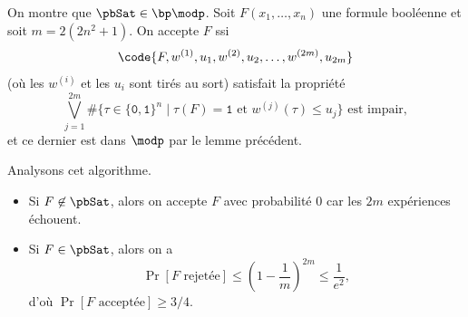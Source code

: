\documentclass[./main]{subfiles}
\begin{document}
  \begin{prv}
    On montre que $\pbSat \in \bp\modp$.
    Soit $F(x_1, \ldots, x_n)$ une formule booléenne et soit $m = 2 (2n^2 + 1)$.
    On accepte $F$ ssi
    \[
    \code{F, w^{(1)}, u_1, w^{(2)}, u_2, \ldots, w^{(2m)}, u_{2m}}
    \]
    (où les $w^{(i)}$ et les $u_i$ sont tirés au sort)
    satisfait la propriété
    \[
    \bigvee_{j=1}^{2m} \# \{\tau \in \{\texttt{0},\texttt{1}\}^n  \mid \tau(F) = \texttt{1} \text{ et } w^{(j)}(\tau) \le u_j\} \text{ est impair}
    ,\] 
    et ce dernier est dans $\modp$ par le lemme précédent.

    Analysons cet algorithme.
    \begin{itemize}
      \item Si $F \not\in \pbSat$, alors on accepte $F$ avec probabilité $0$ car les $2m$ expériences échouent.
      \item Si $F \in \pbSat$, alors on a
        \[
          \Pr[F \text{ rejetée}] \le \left( 1 - \frac{1}{m} \right)^{2m} \le \frac{1}{e^2}
        ,\] 
        d'où $\Pr[F \text{ acceptée}] \ge 3 / 4$.
    \end{itemize}
  \end{prv}
\end{document}
